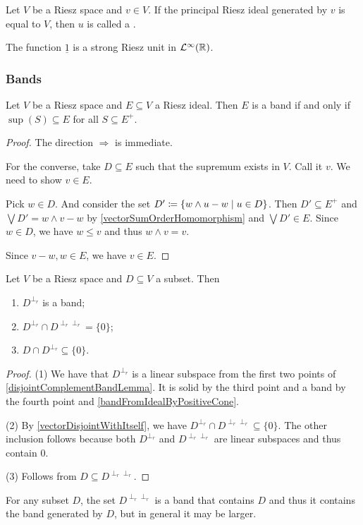 \begin{definition}
Let $V$ be a Riesz space and $v\in V$. If the principal Riesz ideal generated by $v$ is equal to $V$, then $u$ is called a .
\end{definition}

\begin{example}
The function $\underline{1}$ is a strong Riesz unit in $\mathcal{L}^\infty(\mathbb{R})$.
\end{example}

\subsubsection{Bands}

\begin{proposition} \label{bandFromIdealByPositiveCone}
Let $V$ be a Riesz space and $E\subseteq V$ a Riesz ideal. Then $E$ is a band \textup{if and only if} $\sup(S) \subseteq E$ for all $S\subseteq E^+$.
\end{proposition}
\begin{proof}
The direction $\Rightarrow$ is immediate.

For the converse, take $D\subseteq E$ such that the supremum exists in $V$. Call it $v$. We need to show $v\in E$.

Pick $w\in D$. And consider the set $D' \defeq \setbuilder{w\wedge u - w}{u\in D}$. Then $D'\subseteq E^+$ and $\bigvee D' = w\wedge v - w$ by \ref{vectorSumOrderHomomorphism} and $\bigvee D'\in E$. Since $w\in D$, we have $w\leq v$ and thus $w\wedge v = v$.

Since $v-w,w\in E$, we have $v\in E$.
\end{proof}

\begin{lemma} \label{disjointPolarBand}
Let $V$ be a Riesz space and $D\subseteq V$ a subset. Then
\begin{enumerate}
\item $D^{\perp_r}$ is a band;
\item $D^{\perp_r} \cap D^{\perp_r\perp_r} = \{0\}$;
\item $D \cap D^{\perp_r} \subseteq \{0\}$.
\end{enumerate}
\end{lemma}
\begin{proof}
(1) We have that $D^{\perp_r}$ is a linear subspace from the first two points of \ref{disjointComplementBandLemma}. It is solid by the third point and a band by the fourth point and \ref{bandFromIdealByPositiveCone}.

(2) By \ref{vectorDisjointWithItself}, we have $D^{\perp_r} \cap D^{\perp_r\perp_r} \subseteq \{0\}$. The other inclusion follows because both $D^{\perp_r}$ and $D^{\perp_r\perp_r}$ are linear subspaces and thus contain $0$.

(3) Follows from $D\subseteq D^{\perp_r\perp_r}$.
\end{proof}
For any subset $D$, the set $D^{\perp_r\perp_r}$ is a band that contains $D$ and thus it contains the band generated by $D$, but in general it may be larger.


